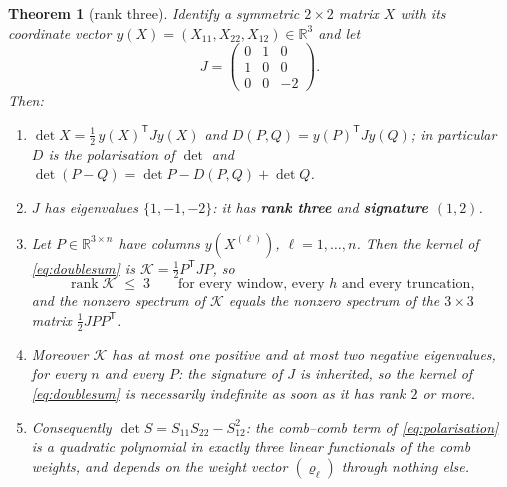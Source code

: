 \documentclass[11pt,a4paper]{article}
\theoremstyle{plain}
\newtheorem{theorem}{Theorem}[section]
\theoremstyle{definition}
\newcommand{\R}{\mathbb{R}}
\newcommand{\T}{\mathsf{T}}
\DeclareMathOperator{\rank}{rank}
\begin{document}
\begin{theorem}[rank three]
\label{thm:rank3}
Identify a symmetric $2\times2$ matrix $X$ with its coordinate vector
$y(X)=(X_{11},X_{22},X_{12})\in\R^{3}$ and let
\begin{equation}
\label{eq:J}
  J=\begin{pmatrix}0&1&0\\ 1&0&0\\ 0&0&-2\end{pmatrix}.
\end{equation}
Then:
\begin{enumerate}[label=\textup{(\roman*)},leftmargin=2.6em]
\item\label{R:pol} $\det X=\tfrac12\,y(X)^{\T}Jy(X)$ and
  $D(P,Q)=y(P)^{\T}Jy(Q)$; in particular $D$ is the polarisation of $\det$ and
  $\det(P-Q)=\det P-D(P,Q)+\det Q$.
\item\label{R:rank} $J$ has eigenvalues $\{1,-1,-2\}$: it has \textbf{rank
  three} and \textbf{signature $(1,2)$}.
\item\label{R:kernel} Let $P\in\R^{3\times n}$ have columns $y(X^{(\ell)})$,
  $\ell=1,\dots,n$. Then the kernel of \eqref{eq:doublesum} is
  $\mathcal K=\tfrac12P^{\T}JP$, so
  \begin{equation}
  \label{eq:rank3}
    \rank\mathcal K\;\le\;3
    \qquad\text{for every window, every }h\text{ and every truncation},
  \end{equation}
  and the nonzero spectrum of $\mathcal K$ equals the nonzero spectrum of the
  $3\times3$ matrix $\tfrac12JPP^{\T}$.
\item\label{R:inertia} Moreover $\mathcal K$ has at most \emph{one} positive
  and at most \emph{two} negative eigenvalues, for every $n$ and every $P$: the
  signature of $J$ is inherited, so the kernel of \eqref{eq:doublesum} is
  necessarily indefinite as soon as it has rank $2$ or more.
\item\label{R:three} Consequently
  $\det S=S_{11}S_{22}-S_{12}^{2}$: the comb--comb term of
  \eqref{eq:polarisation} is a quadratic polynomial in exactly \emph{three}
  linear functionals of the comb weights, and depends on the weight vector
  $(\varrho_\ell)$ through nothing else.
\end{enumerate}
\end{theorem}
\end{document}
